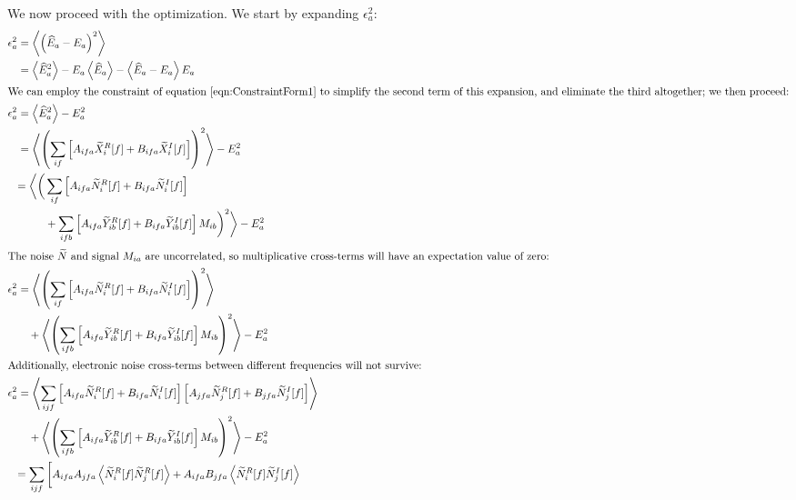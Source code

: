 We now proceed with the optimization.  We start by expanding $\epsilon^2_a$:
\begin{align}
\epsilon^2_a &= \left< \left(\widehat{E}_a - E_a\right)^2\right> \\
%
&= \left< \widehat{E}^2_a \right> - E_a \left<\widehat{E}_a\right> - \left< \widehat{E}_a - E_a \right> E_a \\
%
\intertext{We can employ the constraint of equation~\ref{eqn:ConstraintForm1} to simplify the second term of this expansion, and eliminate the third altogether; we then proceed:}
%
\epsilon^2_a &= \left< \widehat{E}^2_a \right> - E^2_a \\
%
&= \left< \left(\sum_{if}\left[ A_{ifa} \widetilde{X}_i^R[f] + B_{ifa} \widetilde{X}_i^I[f]\right]\right)^2\right> - E^2_a \\
%
& \begin{aligned}= \bigg< \bigg(&
  \sum_{if} \left[ A_{ifa} \widetilde{N}_i^R[f] + B_{ifa} \widetilde{N}_i^I[f]\right] \\
  & + \sum_{ifb} \left[ A_{ifa} \widetilde{Y}_{ib}^R[f] + B_{ifa} \widetilde{Y}_{ib}^I[f]\right]M_{ib}  \bigg)^2 \bigg> - E^2_a
\end{aligned} \\
%
\intertext{The noise $\widetilde{N}$ and signal $M_{ia}$ are uncorrelated, so multiplicative cross-terms will have an expectation value of zero:}
%
\epsilon^2_a &= \left< \left(\sum_{if} \left[ A_{ifa} \widetilde{N}_i^R[f] + B_{ifa} \widetilde{N}_i^I[f]\right]\right)^2\right> \nonumber \\
&\quad + \left<\left(\sum_{ifb} \left[ A_{ifa} \widetilde{Y}_{ib}^R[f] + B_{ifa} \widetilde{Y}_{ib}^I[f]\right]M_{ib} \right)^2 \right> - E^2_a \\
%
\intertext{Additionally, electronic noise cross-terms between different frequencies will not survive:}
%
\epsilon^2_a &= \left< \sum_{ijf} \left[ A_{ifa} \widetilde{N}_i^R[f] + B_{ifa} \widetilde{N}_i^I[f]\right] \left[ A_{jfa} \widetilde{N}_j^R[f] + B_{jfa} \widetilde{N}_j^I[f]\right] \right> \nonumber \\
&\quad + \left<\left(\sum_{ifb} \left[ A_{ifa} \widetilde{Y}_{ib}^R[f] + B_{ifa} \widetilde{Y}_{ib}^I[f]\right]M_{ib} \right)^2 \right> - E^2_a \\
%
& \begin{aligned}
  = \sum_{ijf} \bigg[ & A_{ifa}A_{jfa} \left<\widetilde{N}_i^R[f]\widetilde{N}_j^R[f]\right> + A_{ifa}B_{jfa} \left<\widetilde{N}_i^R[f]\widetilde{N}_j^I[f]\right> \nonumber \\

\end{aligned}
\end{align}
